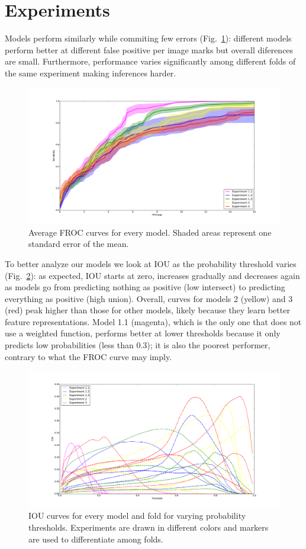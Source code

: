 \section{Experiments}
Models perform similarly while commiting few errors (Fig.~\ref{fig:FROCResults}): different models perform better at different false positive per image marks but overall diferences are small. Furthermore, performance varies significantly among different folds of the same experiment making inferences harder.
\begin{figure}[h]
	\centering
		\includegraphics[width=\textwidth]{plots/FROC_plus_std.pdf}
	\caption[FROC curves]{Average FROC curves for every model. Shaded areas represent one standard error of the mean.}
	\label{fig:FROCResults}
\end{figure}

To better analyze our models we look at IOU as the probability threshold varies (Fig.~\ref{fig:IOUResults}): as expected, IOU starts at zero, increases gradually and decreases again as models go from predicting nothing as positive (low intersect) to predicting everything as positive (high union). Overall, curves for models 2 (yellow) and 3 (red) peak higher than those for other models, likely because they learn better feature representations. Model 1.1 (magenta), which is the only one that does not use a weighted function, performs better at lower thresholds because it only predicts low probabilities (less than 0.3); it is also the poorest performer, contrary to what the FROC curve may imply.
\begin{figure}[h]
	\centering
		\includegraphics[width=\textwidth]{plots/IOU_all_folds.pdf}
	\caption[IOU curves]{IOU curves for every model and fold for varying probability thresholds. Experiments are drawn in different colors and markers are used to differentiate among folds.}
	\label{fig:IOUResults}
\end{figure}


